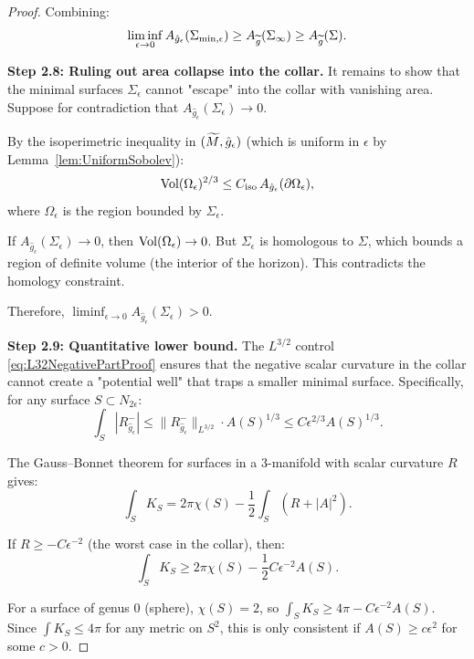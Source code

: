 \begin{proof}
Combining:
\begin{equation}
    \liminf_{\epsilon \to 0} A_{\hat{g}_\epsilon}(\Sigma_{\min,\epsilon}) \ge A_{\widetilde{g}}(\Sigma_\infty) \ge A_{\widetilde{g}}(\Sigma).
\end{equation}

\textbf{Step 2.8: Ruling out area collapse into the collar.}
It remains to show that the minimal surfaces $\Sigma_\epsilon$ cannot "escape" into the collar with vanishing area. Suppose for contradiction that $A_{\hat{g}_\epsilon}(\Sigma_\epsilon) \to 0$.

By the isoperimetric inequality in $(\widetilde{M}, \hat{g}_\epsilon)$ (which is uniform in $\epsilon$ by Lemma~\ref{lem:UniformSobolev}):
\begin{equation}
    \operatorname{Vol}(\Omega_\epsilon)^{2/3} \le C_{\text{iso}} \, A_{\hat{g}_\epsilon}(\partial \Omega_\epsilon),
\end{equation}
where $\Omega_\epsilon$ is the region bounded by $\Sigma_\epsilon$.

If $A_{\hat{g}_\epsilon}(\Sigma_\epsilon) \to 0$, then $\operatorname{Vol}(\Omega_\epsilon) \to 0$. But $\Sigma_\epsilon$ is homologous to $\Sigma$, which bounds a region of definite volume (the interior of the horizon). This contradicts the homology constraint.

Therefore, $\liminf_{\epsilon \to 0} A_{\hat{g}_\epsilon}(\Sigma_\epsilon) > 0$.

\textbf{Step 2.9: Quantitative lower bound.}
The $L^{3/2}$ control \eqref{eq:L32NegativePartProof} ensures that the negative scalar curvature in the collar cannot create a "potential well" that traps a smaller minimal surface. Specifically, for any surface $S \subset N_{2\epsilon}$:
\begin{equation}
    \int_S |R^-_{\hat{g}_\epsilon}| \le \|R^-_{\hat{g}_\epsilon}\|_{L^{3/2}} \cdot A(S)^{1/3} \le C \epsilon^{2/3} A(S)^{1/3}.
\end{equation}

The Gauss--Bonnet theorem for surfaces in a 3-manifold with scalar curvature $R$ gives:
\begin{equation}
    \int_S K_S = 2\pi \chi(S) - \frac{1}{2}\int_S (R + |A|^2).
\end{equation}

If $R \ge -C\epsilon^{-2}$ (the worst case in the collar), then:
\begin{equation}
    \int_S K_S \ge 2\pi \chi(S) - \frac{1}{2} C\epsilon^{-2} A(S).
\end{equation}

For a surface of genus 0 (sphere), $\chi(S) = 2$, so $\int_S K_S \ge 4\pi - C\epsilon^{-2} A(S)$. Since $\int K_S \le 4\pi$ for any metric on $S^2$, this is only consistent if $A(S) \ge c \epsilon^2$ for some $c > 0$.


\end{proof}
